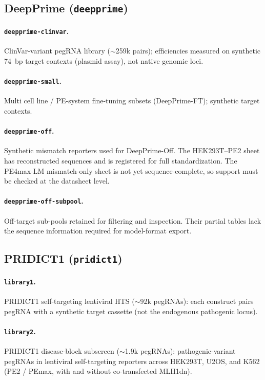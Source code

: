 \documentclass{article}
\begin{document}
\subsection{DeepPrime (\texorpdfstring{\nolinkurl{deepprime}}{deepprime})}

\paragraph{\nolinkurl{deepprime-clinvar}.}
ClinVar-variant pegRNA library (${\sim}$259k pairs); efficiencies measured on synthetic 74~bp target contexts (plasmid assay), not native genomic loci.

\paragraph{\nolinkurl{deepprime-small}.}
Multi cell line / PE-system fine-tuning subsets (DeepPrime-FT); synthetic target contexts.

\paragraph{\nolinkurl{deepprime-off}.}
Synthetic mismatch reporters used for DeepPrime-Off. The HEK293T--PE2 sheet has reconstructed sequences and is registered for full standardization. The PE4max-LM mismatch-only sheet is not yet sequence-complete, so support must be checked at the datasheet level.

\paragraph{\nolinkurl{deepprime-off-subpool}.}
Off-target sub-pools retained for filtering and inspection. Their partial tables lack the sequence information required for model-format export.

\subsection{PRIDICT1 (\texorpdfstring{\nolinkurl{pridict1}}{pridict1})}

\paragraph{\nolinkurl{library1}.}
PRIDICT1 self-targeting lentiviral HTS (${\sim}$92k pegRNAs): each construct pairs pegRNA with a synthetic target cassette (not the endogenous pathogenic locus).

\paragraph{\nolinkurl{library2}.}
PRIDICT1 disease-block subscreen (${\sim}$1.9k pegRNAs): pathogenic-variant pegRNAs in lentiviral self-targeting reporters across HEK293T, U2OS, and K562 (PE2 / PEmax, with and without co-transfected MLH1dn).
\end{document}
